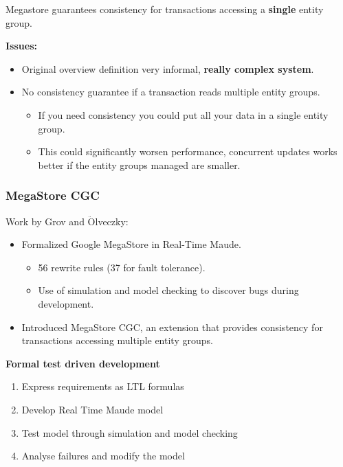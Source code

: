 \documentclass{beamer}
\begin{document}
\begin{frame}
    
    \large
    Megastore  guarantees consistency for transactions accessing a \textbf{single} entity group.

    \bigskip
    \textbf{Issues:}
    \begin{itemize}
        \item Original overview definition very informal, \textbf{really complex system}.
        \item No consistency guarantee if a transaction reads multiple entity groups.
        \begin{itemize}
            \item If you need consistency you could put all your data in a single entity group. 
            \item This could significantly worsen performance, concurrent updates works better 
            if the entity groups managed are smaller.
        \end{itemize}
    \end{itemize}
    
\end{frame}
\begin{frame}
    \frametitle{MegaStore CGC}
    \small
    Work by  Grov and $\ddot{\text{O}}$lveczky:
    \begin{itemize}
        \item Formalized Google MegaStore in Real-Time Maude.
        \begin{itemize}
            \item 56 rewrite rules (37 for fault tolerance).
            \item Use  of simulation and model checking to discover bugs during development.
        \end{itemize} 
        \item Introduced MegaStore CGC, an extension that provides consistency for transactions 
        accessing multiple entity groups. 
    \end{itemize} 
    
    \bigskip
    \begin{center}
    \textbf{Formal test driven development}
        \begin{enumerate}
            \item Express requirements as LTL formulas
            \item Develop Real Time Maude model 
            \item Test model through simulation and model checking 
            \item Analyse failures and modify the model
        \end{enumerate}
    \end{center}
\end{frame}
\end{document}
